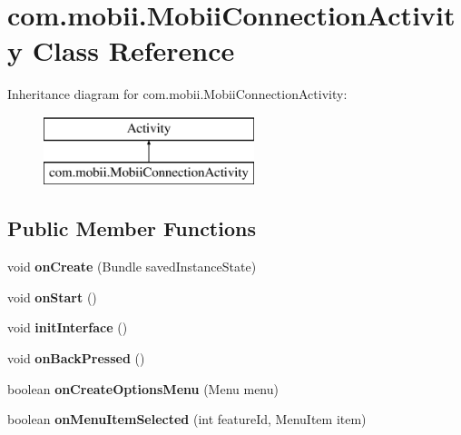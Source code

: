 \hypertarget{classcom_1_1mobii_1_1_mobii_connection_activity}{\section{com.\-mobii.\-Mobii\-Connection\-Activity Class Reference}
\label{classcom_1_1mobii_1_1_mobii_connection_activity}
}
Inheritance diagram for com.\-mobii.\-Mobii\-Connection\-Activity\-:\begin{figure}[H]
\begin{center}
\leavevmode
\includegraphics[height=2.000000cm]{classcom_1_1mobii_1_1_mobii_connection_activity}
\end{center}
\end{figure}
\subsection*{Public Member Functions}
\begin{DoxyCompactItemize}
\item 
\hypertarget{classcom_1_1mobii_1_1_mobii_connection_activity_a5f1b001f373ca0756a82b256da3eddcb}{void {\bfseries on\-Create} (Bundle saved\-Instance\-State)}\label{classcom_1_1mobii_1_1_mobii_connection_activity_a5f1b001f373ca0756a82b256da3eddcb}

\item 
\hypertarget{classcom_1_1mobii_1_1_mobii_connection_activity_a80f66d02d87f13185b55f3f471792c90}{void {\bfseries on\-Start} ()}\label{classcom_1_1mobii_1_1_mobii_connection_activity_a80f66d02d87f13185b55f3f471792c90}

\item 
\hypertarget{classcom_1_1mobii_1_1_mobii_connection_activity_af26e4d03a3b6ec3ecb52dedf3ea60b55}{void {\bfseries init\-Interface} ()}\label{classcom_1_1mobii_1_1_mobii_connection_activity_af26e4d03a3b6ec3ecb52dedf3ea60b55}

\item 
\hypertarget{classcom_1_1mobii_1_1_mobii_connection_activity_ad191838f1625f8f4e2bae046324f9a3d}{void {\bfseries on\-Back\-Pressed} ()}\label{classcom_1_1mobii_1_1_mobii_connection_activity_ad191838f1625f8f4e2bae046324f9a3d}

\item 
\hypertarget{classcom_1_1mobii_1_1_mobii_connection_activity_a41b8f45b7f3185d2a89c4569aba68a97}{boolean {\bfseries on\-Create\-Options\-Menu} (Menu menu)}\label{classcom_1_1mobii_1_1_mobii_connection_activity_a41b8f45b7f3185d2a89c4569aba68a97}

\item 
\hypertarget{classcom_1_1mobii_1_1_mobii_connection_activity_a5bd6df5a37157c70509ba9f3785ad72e}{boolean {\bfseries on\-Menu\-Item\-Selected} (int feature\-Id, Menu\-Item item)}\label{classcom_1_1mobii_1_1_mobii_connection_activity_a5bd6df5a37157c70509ba9f3785ad72e}

\end{DoxyCompactItemize}
